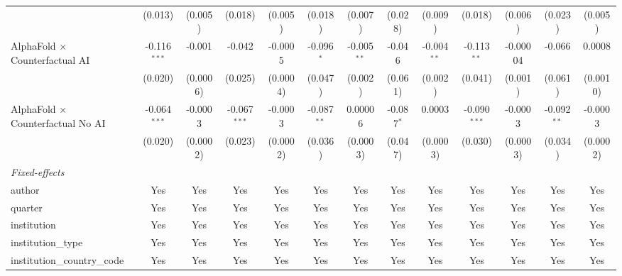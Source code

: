 \begin{tabular}{lcccccccccccc}
                                            & (0.013)        & (0.005)     & (0.018)        & (0.005)  & (0.018)       & (0.007)       & (0.028)       & (0.009)       & (0.018)        & (0.006)        & (0.023)       & (0.005)\\   
   AlphaFold $\times$ Counterfactual AI     & -0.116$^{***}$ & -0.001      & -0.042         & -0.0005  & -0.096$^{*}$  & -0.005$^{**}$ & -0.046        & -0.004$^{**}$ & -0.113$^{**}$  & -0.00004       & -0.066        & 0.0008\\   
                                            & (0.020)        & (0.0006)    & (0.025)        & (0.0004) & (0.047)       & (0.002)       & (0.061)       & (0.002)       & (0.041)        & (0.001)        & (0.061)       & (0.0010)\\   
   AlphaFold $\times$ Counterfactual No AI  & -0.064$^{***}$ & -0.0003     & -0.067$^{***}$ & -0.0003  & -0.087$^{**}$ & 0.00006       & -0.087$^{*}$  & 0.0003        & -0.090$^{***}$ & -0.0003        & -0.092$^{**}$ & -0.0003\\   
                                            & (0.020)        & (0.0002)    & (0.023)        & (0.0002) & (0.036)       & (0.0003)      & (0.047)       & (0.0003)      & (0.030)        & (0.0003)       & (0.034)       & (0.0002)\\   
   \midrule
   \emph{Fixed-effects}\\
   author                                   & Yes            & Yes         & Yes            & Yes      & Yes           & Yes           & Yes           & Yes           & Yes            & Yes            & Yes           & Yes\\  
   quarter                                  & Yes            & Yes         & Yes            & Yes      & Yes           & Yes           & Yes           & Yes           & Yes            & Yes            & Yes           & Yes\\  
   institution                              & Yes            & Yes         & Yes            & Yes      & Yes           & Yes           & Yes           & Yes           & Yes            & Yes            & Yes           & Yes\\  
   institution\_type                        & Yes            & Yes         & Yes            & Yes      & Yes           & Yes           & Yes           & Yes           & Yes            & Yes            & Yes           & Yes\\  
   institution\_country\_code               & Yes            & Yes         & Yes            & Yes      & Yes           & Yes           & Yes           & Yes           & Yes            & Yes            & Yes           & Yes\\  

\end{tabular}
